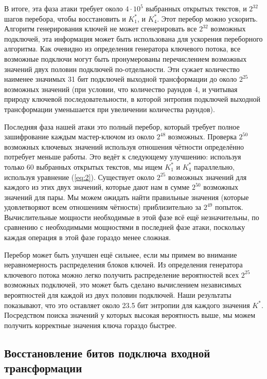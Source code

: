 \documentclass[12pt, a4paper]{article}
\begin{document}
В итоге, эта фаза атаки требует около $4 \cdot 10^5$ выбранных открытых текстов, и $2^{32}$ шагов перебора, чтобы восстановить и $K^*_1$, и $K^*_4$. Этот перебор можно ускорить. Алгоритм генерирования ключей не может сгенерировать все $2^{32}$ возможных подключей, эта информация может быть использована для ускорения переборного алгоритма. Как очевидно из определения генератора ключевого потока, все возможные подключи могут быть пронумерованы перечислением возможных значений двух половин подключей по-отдельности. Эти сужает количество наименее значимых 31 бит подключей выходной трансформации до около $2^{25}$ возможных значений (при условии, что количество раундов 4, и учитывая природу ключевой последовательности, в которой энтропия подключей выходной трансформации уменьшается при увеличении количества раундов).

Последняя фаза нашей атаки это полный перебор, который требует полное зашифрование каждым мастер-ключом из около $2^{48}$ возможных. Проверка $2^{50}$ возможных ключевых значений используя отношения чётности определённо потребует меньше работы. Это ведёт к следующему улучшению: используя только 60 выбранных открытых текстов, мы ищем $K^*_1$ и $K^*_4$ параллельно, используя уравнение (\ref{eq:2}). Существует около $2^{25}$ возможных значений для каждого из этих двух значений, которые дают нам в сумме $2^{50}$ возможных значений для пары. Мы можем ожидать найти правильные значения (которые удовлетворяют всем отношениям чётности) приблизительно за $2^49$ попыток. Вычислительные мощности необходимые в этой фазе всё ещё незначительны, по сравнению с необходимыми мощностями в последней фазе атаки, поскольку каждая операция в этой фазе гораздо менее сложная.

Перебор может быть улучшен ещё сильнее, если мы примем во внимание неравномерность распределения блоков ключей. Из определения генератора ключевого потока можно легко получить распределение вероятностей всех $2^{25}$ возможных подключей, это может быть сделано вычислением независимых вероятностей для каждой из двух половин подключей. Наши результаты показывают, что это оставляет около 23.5 бит энтропии для каждого значения $K^*$.
Посредством поиска значений у которых высокая вероятность выше, мы можем получить корректные значения ключа гораздо быстрее.



\subsection{Восстановление битов подключа входной трансформации}
\end{document}
